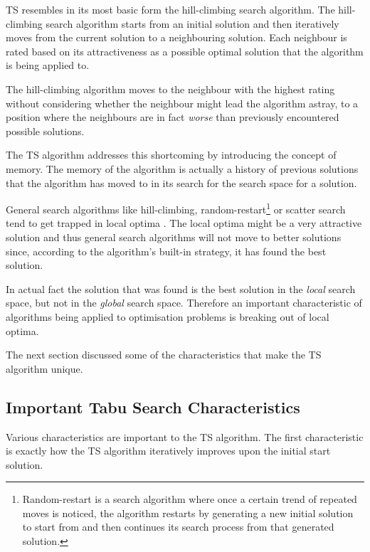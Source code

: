 \gls{TS} resembles in its most basic form the hill-climbing search algorithm\cite{TabuBiddingStrats}. The hill-climbing search algorithm starts from an initial solution and then iteratively moves from the current solution to a neighbouring solution\cite{AIModernApproach}. Each neighbour is rated based on its attractiveness as a possible optimal solution that the algorithm is being applied to\cite{AIModernApproach}. 

The hill-climbing algorithm moves to the neighbour with the highest rating without considering whether the neighbour might lead the algorithm astray, to a position where the neighbours are in fact \emph{worse} than previously encountered possible solutions\cite{AIModernApproach}. 

The \gls{TS} algorithm addresses this shortcoming by introducing the concept of memory\cite{TabuBiddingStrats}. The memory of the algorithm is actually a history of previous solutions that the algorithm has moved to in its search for the search space for a solution\cite{TabuBiddingStrats}. 

General search algorithms like hill-climbing, random-restart\footnote{Random-restart is a search algorithm where once a certain trend of repeated moves is noticed, the algorithm restarts by generating a new initial solution to start from and then continues its search process from that generated solution\cite{AIModernApproach}.} or scatter search tend to get trapped in local optima \cite{AIModernApproach}. The local optima might be a very attractive solution and thus general search algorithms will not move to better solutions since, according to the algorithm's built-in strategy, it has found the best solution. 

In actual fact the solution that was found is the best solution in the \emph{local} search space, but not in the \emph{global} search space\cite{CompuIntelligenceIntro,AIModernApproach}. Therefore an important characteristic of algorithms being applied to optimisation problems is breaking out of local optima\cite{CompuIntelligenceIntro,AIModernApproach}.

The next section discussed some of the characteristics that make the \gls{TS} algorithm unique.

\subsection{Important Tabu Search Characteristics}
\label{sec:TScharacteristics}
Various characteristics are important to the \gls{TS} algorithm. The first characteristic is exactly how the \gls{TS} algorithm iteratively improves upon the initial start solution.

